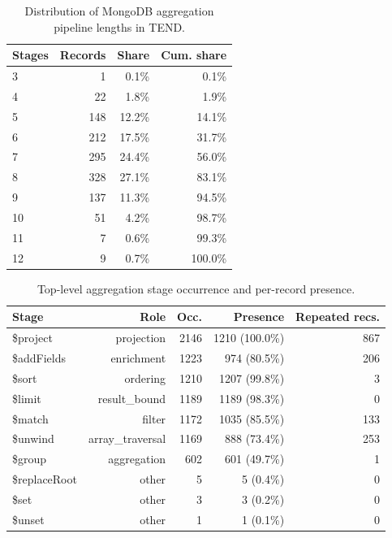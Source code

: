\begin{table}[t]
\centering
\caption{Distribution of MongoDB aggregation pipeline lengths in TEND.}
\label{tab:tend-stage-counts}
\begin{tabular}{lrrr}
\toprule
Stages & Records & Share & Cum. share \\
\midrule
3 & 1 & 0.1\% & 0.1\% \\
4 & 22 & 1.8\% & 1.9\% \\
5 & 148 & 12.2\% & 14.1\% \\
6 & 212 & 17.5\% & 31.7\% \\
7 & 295 & 24.4\% & 56.0\% \\
8 & 328 & 27.1\% & 83.1\% \\
9 & 137 & 11.3\% & 94.5\% \\
10 & 51 & 4.2\% & 98.7\% \\
11 & 7 & 0.6\% & 99.3\% \\
12 & 9 & 0.7\% & 100.0\% \\
\bottomrule
\end{tabular}
\end{table}

\begin{table}[t]
\centering
\caption{Top-level aggregation stage occurrence and per-record presence.}
\label{tab:tend-stage-types}
\begin{tabular}{lrrrr}
\toprule
Stage & Role & Occ. & Presence & Repeated recs. \\
\midrule
\$project & projection & 2146 & 1210 (100.0\%) & 867 \\
\$addFields & enrichment & 1223 & 974 (80.5\%) & 206 \\
\$sort & ordering & 1210 & 1207 (99.8\%) & 3 \\
\$limit & result\_bound & 1189 & 1189 (98.3\%) & 0 \\
\$match & filter & 1172 & 1035 (85.5\%) & 133 \\
\$unwind & array\_traversal & 1169 & 888 (73.4\%) & 253 \\
\$group & aggregation & 602 & 601 (49.7\%) & 1 \\
\$replaceRoot & other & 5 & 5 (0.4\%) & 0 \\
\$set & other & 3 & 3 (0.2\%) & 0 \\
\$unset & other & 1 & 1 (0.1\%) & 0 \\
\bottomrule
\end{tabular}
\end{table}

